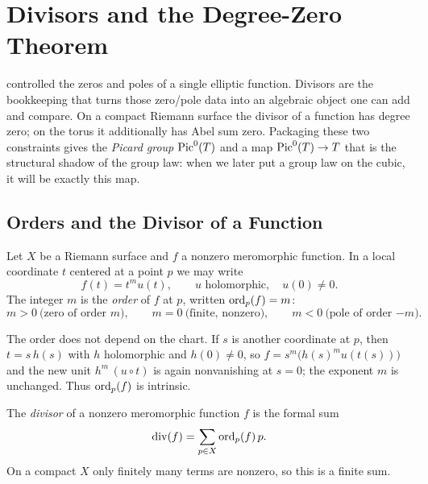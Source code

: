 \chapter{Divisors and the Degree-Zero Theorem}
\label{ch:divisors}

 controlled the zeros and poles of a single elliptic
function. Divisors are the bookkeeping that turns those zero/pole data into an
algebraic object one can add and compare. On a compact Riemann surface the
divisor of a function has degree zero; on the torus it additionally has Abel sum
zero. Packaging these two constraints gives the \emph{Picard group}
\(\operatorname{Pic}^0(T)\) and a map \(\operatorname{Pic}^0(T) \to T\) that is the structural shadow of the
group law: when we later put a group law on the cubic, it will be exactly this
map.

\section{Orders and the Divisor of a Function}
\label{sec:div-orders}

Let \(X\) be a Riemann surface and \(f\) a nonzero meromorphic function. In a
local coordinate \(t\) centered at a point \(p\) we may write
\[
  f(t) = t^{m} u(t), \qquad u \text{ holomorphic}, \quad u(0) \ne 0 .
\]
The integer \(m\) is the \emph{order} of \(f\) at \(p\), written
\(\operatorname{ord}_p(f) = m\):
\[
  m > 0 \ \text{(zero of order } m),\qquad
  m = 0 \ \text{(finite, nonzero)},\qquad
  m < 0 \ \text{(pole of order } {-m}).
\]

\begin{remark}
\label{rem:div-ord-welldef}
The order does not depend on the chart. If \(s\) is another coordinate at
\(p\), then \(t = s\,h(s)\) with \(h\) holomorphic and \(h(0) \ne 0\), so
\(f = s^{m}\bigl(h(s)^{m} u(t(s))\bigr)\) and the new unit
\(h^{m}\,(u\circ t)\) is again nonvanishing at \(s=0\); the exponent \(m\) is
unchanged. Thus \(\operatorname{ord}_p(f)\) is intrinsic.
\end{remark}

\begin{definition}
\label{def:div-divisor-of-f}
The \emph{divisor} of a nonzero meromorphic function \(f\) is the formal sum
\[
  \operatorname{div}(f) = \sum_{p \in X} \operatorname{ord}_p(f)\, p .
\]
On a compact \(X\) only finitely many terms are nonzero, so this is a finite
sum.
\end{definition}

